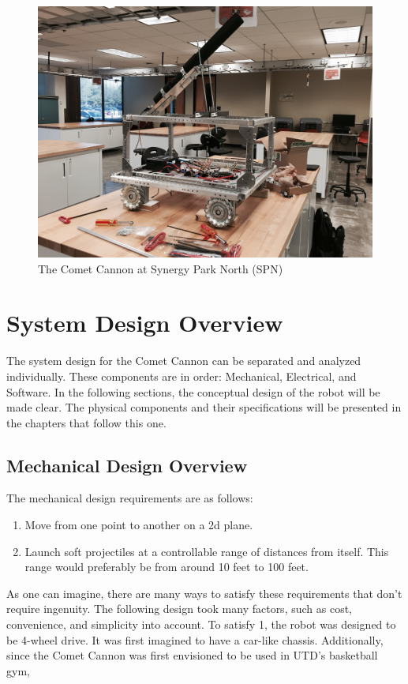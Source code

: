 \documentclass[letterpaper,12pt]{report}
\newcommand{\botname}{Comet Cannon }
\begin{document}
\begin{figure}[!h]
\centering
    \includegraphics[width=14cm]{./pics/chassis/robot.jpg}
    \caption{The \botname at Synergy Park North (SPN)}
\end{figure}

\pagebreak
\tableofcontents
\pagebreak

\chapter{System Design Overview}
The system design for the \botname can be separated and analyzed individually.
These components are in order: Mechanical, Electrical, and Software. In the
following sections, the conceptual design of the robot will be made clear.
The physical components and their specifications will be presented in the
chapters that follow this one.

\section{Mechanical Design Overview}
The mechanical design requirements are as follows:

\begin{enumerate}
    \item Move from one point to another on a 2d plane.
    \item Launch soft projectiles at a controllable range of distances from
        itself. This range would preferably be from around 10 feet to 100 feet.
\end{enumerate}

As one can imagine, there are many ways to satisfy these requirements that
don't require ingenuity. The following design took many factors, such as cost,
convenience, and simplicity into account. To satisfy 1, the robot was designed
to be 4-wheel drive. It was first imagined to have a car-like chassis.
Additionally, since the \botname was first envisioned to be used in UTD's
basketball gym,
\end{document}
